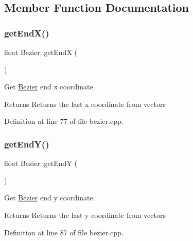 \subsection{Member Function Documentation}
\mbox{\label{classBezier_aef4b9fbe3b5d30ea6b42de7fc38cf796}} 
\subsubsection{\texorpdfstring{get\+End\+X()}{getEndX()}}
{\footnotesize\ttfamily float Bezier\+::get\+EndX (\begin{DoxyParamCaption}{ }\end{DoxyParamCaption})}



Get \mbox{\hyperlink{classBezier}{Bezier}} end x coordinate. 

\begin{DoxyReturn}{Returns}
Returns the last x coordinate from vectors 
\end{DoxyReturn}


Definition at line 77 of file bezier.\+cpp.

\mbox{\label{classBezier_abb9094c95311d916aad946d90a9b5c12}} 
\subsubsection{\texorpdfstring{get\+End\+Y()}{getEndY()}}
{\footnotesize\ttfamily float Bezier\+::get\+EndY (\begin{DoxyParamCaption}{ }\end{DoxyParamCaption})}



Get \mbox{\hyperlink{classBezier}{Bezier}} end y coordinate. 

\begin{DoxyReturn}{Returns}
Returns the last y coordinate from vectors 
\end{DoxyReturn}


Definition at line 87 of file bezier.\+cpp.

\mbox{\label{classBezier_a81efbcfa1f2bc8bf3c539dba1a4b80e0}} 
